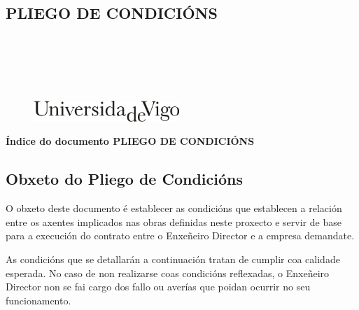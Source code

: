 \documentclass[11pt,twoside]{book}
\begin{document}
\begin{center}
\begin{normalsize}
\begin{center}
\part{\bf{PLIEGO DE CONDICIÓNS}}\thispagestyle{empty}
\end{center}
\end{normalsize}
\ \\
\ \\
\ \\
\ \\

\begin{center}
\begin{figure}[htbp]
\begin{center}
\includegraphics[angle=0, height=0.8cm]{images/UVIGOLogo.png}
\end{center}
\end{figure}
\end{center}

\end{center}

\cleardoublepage


\pagestyle{fancy}
\startcontents[parts]
\begin{center}{\large \bf Índice do documento PLIEGO DE CONDICIÓNS}\end{center}

{\hypersetup{hidelinks}}

\cleardoublepage

\chapter{Obxeto do Pliego de Condicións}

O obxeto deste documento é establecer as condicións que establecen a relación entre os axentes implicados nas obras definidas neste proxecto e servir de base para a execución do contrato entre o Enxeñeiro Director e a empresa demandate.

As condicións que se detallarán a continuación tratan de cumplir coa calidade esperada. No caso de non realizarse coas condicións reflexadas, o Enxeñeiro Director non se fai cargo dos fallo ou averías que poidan ocurrir no seu funcionamento.
\end{document}
